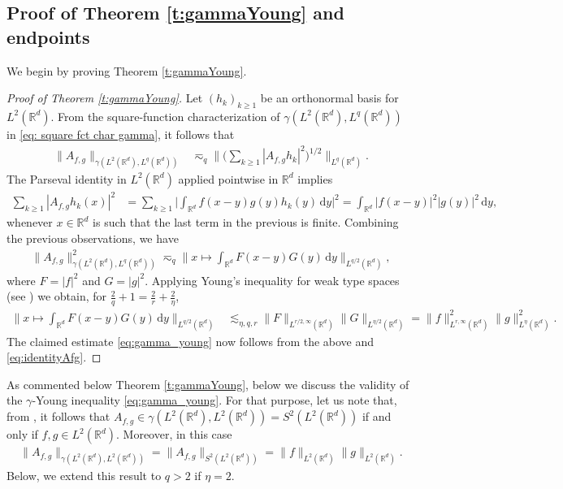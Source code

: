 \documentclass[reqno]{amsart}
\theoremstyle{plain}
\theoremstyle{remark}
\theoremstyle{plain}
\numberwithin{equation}{section}
\def\R{{\mathbb R}}
\newcommand{\di}{\mathrm{d}}
\newcommand{\1}{\one}
\begin{document}
\subsection{Proof of Theorem \ref{t:gammaYoung} and endpoints}
\label{ss:gamma_young_proof}
We begin by proving Theorem \ref{t:gammaYoung}.

\begin{proof}[Proof of Theorem \ref{t:gammaYoung}]
Let $(h_k)_{k\geq 1}$ be an orthonormal basis for $L^2(\R^d)$. From the square-function characterization of $\gamma(L^2(\R^d),L^q(\R^d))$ in \eqref{eq: square fct char gamma}, it follows that 
\begin{align*}
\|A_{f,g}\|_{\gamma(L^2(\R^d),L^q(\R^d))}& \eqsim_q \Big\|\Big(\sum_{k\geq 1} |A_{f,g} h_k|^2 \Big)^{1/2} \Big\|_{L^q(\R^d)}.
\end{align*}
The Parseval identity in $L^2(\R^d)$ applied pointwise in $\R^d$ implies
\begin{align*}
 \sum_{k\geq 1} |A_{f,g} h_k(x)|^2 
 &=
  \sum_{k\geq 1} \Big|\int_{\R^d} f(x-y) g(y) h_k(y)\,\di y\Big|^2   = \int_{\R^d}|f(x-y)|^2 |g(y)|^2 \, \di y,
\end{align*}
whenever $x\in \R^d$ is such that the last term in the previous is finite. Combining the previous observations, we have
\begin{align}\label{eq:identityAfg}
\|A_{f,g}\|_{\gamma(L^2(\R^d),L^q(\R^d))}^2\eqsim_q \Big\|x\mapsto \int_{\R^d} F(x-y) G(y) \,\di y\Big\|_{L^{q/2}(\R^d)},
\end{align}
where $F = |f|^2$ and $G = |g|^2$.  Applying Young's inequality for weak type spaces (see \cite[Theorem 1.4.25]{Grafakos1}) we obtain, for $\tfrac{2}{q}+1 = \tfrac{2}{r}+\tfrac{2}{\eta}$,
\begin{align*}
\Big\|x\mapsto \int_{\R^d} F(x-y) G(y) \, \di y\Big\|_{L^{q/2}(\R^d)} & \lesssim_{\eta,q,r} \|F\|_{L^{r/2,\infty}(\R^d)} \|G\|_{L^{\eta/2}(\R^d)} 
 = \|f\|_{L^{r,\infty}(\R^d)}^2 \|g\|_{L^{\eta}(\R^d)}^2. 
\end{align*}
The claimed estimate \eqref{eq:gamma_young} now follows from the above and \eqref{eq:identityAfg}. 
\end{proof}

As commented below Theorem \ref{t:gammaYoung}, below we discuss the validity of the $\gamma$-Young inequality \eqref{eq:gamma_young}. For that purpose, let us note that, from \cite[Chapter 4]{Simon05}, it follows that $A_{f,g}\in \gamma(L^2(\R^d), L^2(\R^d)) = S^2(L^2(\R^d))$ if and only if $f,g\in L^2(\R^d)$. Moreover, in this case 
\begin{align}\label{eq:Simon}
\|A_{f,g}\|_{\gamma(L^2(\R^d), L^2(\R^d))} = \|A_{f,g}\|_{S^2(L^2(\R^d))} = \|f\|_{L^2(\R^d)} \|g\|_{L^2(\R^d)}.
\end{align}
Below, we extend this result to $q>2$ if $\eta = 2$. 
\end{document}
